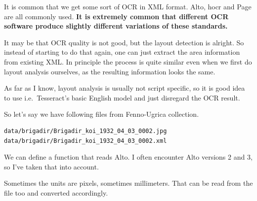 \documentclass[]{book}
\begin{document}
It is common that we get some sort of OCR in XML format. Alto, hocr and Page are all commonly used. \textbf{It is extremely common that different OCR software produce slightly different variations of these standards.}

It may be that OCR quality is not good, but the layout detection is alright. So instead of starting to do that again, one can just extract the area information from existing XML. In principle the process is quite similar even when we first do layout analysis ourselves, as the resulting information looks the same.

As far as I know, layout analysis is usually not script specific, so it is good idea to use i.e.~Tesseract's basic English model and just disregard the OCR result.

So let's say we have following files from Fenno-Ugrica collection.

\begin{verbatim}
data/brigadir/Brigadir_koi_1932_04_03_0002.jpg
data/brigadir/Brigadir_koi_1932_04_03_0002.xml
\end{verbatim}

We can define a function that reads Alto. I often encounter Alto versions 2 and 3, so I've taken that into account.

Sometimes the units are pixels, sometimes millimeters. That can be read from the file too and converted accordingly.
\end{document}
